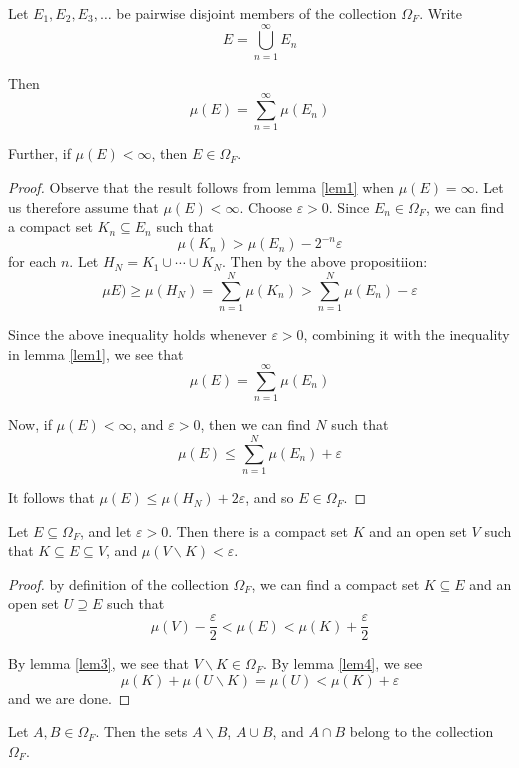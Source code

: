 \begin{lemma} \label{lem4}
Let $E_1,E_2,E_3,\ldots$ be pairwise disjoint members of the collection $\Omega_F$.  Write
$$E = \bigcup_{n=1}^\infty E_n$$

Then
$$\mu (E) = \sum_{n=1}^\infty \mu (E_n)$$

Further, if $\mu (E) <\infty$, then $E\in \Omega_F$.
\end{lemma}

\begin{proof}
Observe that the result follows from lemma \ref{lem1} when $\mu (E)=\infty$.  Let us therefore assume that $\mu (E)<\infty$.  Choose $\varepsilon >0$.  Since $E_n\in \Omega_F$, we can find a compact set $K_n \subseteq E_n$ such that
$$\mu (K_n )> \mu (E_n ) - 2^{-n} \varepsilon$$
for each $n$.  Let $H_N = K_1 \cup \cdots \cup K_N$.  Then by the above propositiion:
$$\mu E) \geq \mu (H_N) = \sum_{n=1}^N \mu (K_n) > \sum_{n=1}^N \mu (E_n) - \varepsilon$$

Since the above inequality holds whenever $\varepsilon >0$, combining it with the inequality in lemma \ref{lem1}, we see that
$$\mu (E) = \sum_{n=1}^\infty \mu (E_n)$$

Now, if $\mu (E)<\infty$, and $\varepsilon >0$, then we can find $N$ such that
$$\mu (E) \leq \sum_{n=1}^N \mu (E_n) + \varepsilon$$

It follows that $\mu (E)\leq \mu (H_N) +2\varepsilon$, and so $E\in \Omega_F$.
\end{proof}

\begin{proposition} \label{lem5}
Let $E\subseteq \Omega_F$, and let $\varepsilon >0$.  Then there is a compact set $K$ and an open set $V$ such that $K\subseteq E\subseteq V$, and $\mu (V\backslash K)<\varepsilon$.
\end{proposition}

\begin{proof}
by definition of the collection $\Omega_F$, we can find a compact set $K\subseteq E$ and an open set $U\supseteq E$ such that
$$\mu (V) - \frac{\varepsilon}{2} < \mu (E) < \mu(K) + \frac{\varepsilon}{2}$$

By lemma \ref{lem3}, we see that $V\backslash K \in \Omega_F$.  By lemma \ref{lem4}, we see
$$\mu (K) + \mu (U\backslash K) = \mu (U) < \mu (K) +\varepsilon$$
and we are done.
\end{proof}

\begin{proposition}
Let $A,B\in \Omega_F$.  Then the sets $A\backslash B$, $A\cup B$, and $A\cap B$ belong to the collection $\Omega_F$.
\end{proposition}


